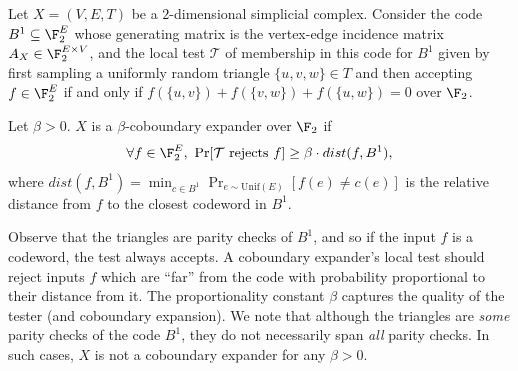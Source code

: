 % 
\begin{definition}
    Let $X = (V,E,T)$ be a $2$-dimensional simplicial complex. Consider the code $B^1 \subseteq \F_2^E$ whose generating matrix is the vertex-edge incidence matrix $A_X\in \F_2^{E\times V}$, and the local test $\mathcal{T}$ of membership in this code for $B^1$ given by first sampling a uniformly random triangle $\{u,v,w\}\in T$ and then accepting $f\in \F_2^E$ if and only if $ f(\{u, v\})+f(\{v, w\})+f(\{u,w\}) = 0$ over $\F_2$. 
    
    Let \(\beta > 0\). $X$ is a $\beta$-coboundary expander over $\F_2$ if 
    \[\forall f \in \F_2^E,~\Pr[\mathcal{T} \text{ rejects }f] \ge \beta\cdot dist(f,B^1),\]
    where $dist(f,B^1) = \min_{c\in B^1}\Pr_{e\sim \mathrm{Unif}(E)}[f(e)\neq c(e)]$ is the relative distance from $f$ to the closest codeword in $B^1$. 
\end{definition}
Observe that the triangles are parity checks of \(B^1\), and so if the input \(f\) is a codeword, the test always accepts. A coboundary expander's local test should reject inputs $f$ which are ``far'' from the code with probability proportional to their distance from it. The proportionality constant \(\beta\) captures the quality of the tester (and coboundary expansion). We note that although the triangles are \emph{some} parity checks of the code $B^1$, they do not necessarily span \emph{all} parity checks. In such cases, \(X\) is not a coboundary expander for any \(\beta > 0\). 

 

